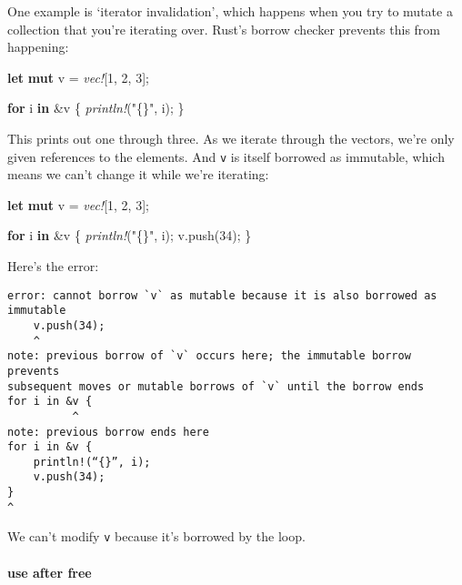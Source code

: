 \documentclass[a4paper,]{book}
\newenvironment{Shaded}{\begin{snugshade}}{\end{snugshade}}
\newcommand{\KeywordTok}[1]{\textcolor[rgb]{0.13,0.29,0.53}{\textbf{{#1}}}}
\newcommand{\DecValTok}[1]{\textcolor[rgb]{0.00,0.00,0.81}{{#1}}}
\newcommand{\StringTok}[1]{\textcolor[rgb]{0.31,0.60,0.02}{{#1}}}
\newcommand{\PreprocessorTok}[1]{\textcolor[rgb]{0.56,0.35,0.01}{\textit{{#1}}}}
\newcommand{\NormalTok}[1]{{#1}}
\let\oldparagraph\paragraph
\renewcommand{\paragraph}[1]{\oldparagraph{#1}\mbox{}}
\begin{document}
One example is `iterator invalidation', which happens when you try to
mutate a collection that you're iterating over. Rust's borrow checker
prevents this from happening:

\begin{Shaded}
\begin{Highlighting}[]
\KeywordTok{let} \KeywordTok{mut} \NormalTok{v = }\PreprocessorTok{vec!}\NormalTok{[}\DecValTok{1}\NormalTok{, }\DecValTok{2}\NormalTok{, }\DecValTok{3}\NormalTok{];}

\KeywordTok{for} \NormalTok{i }\KeywordTok{in} \NormalTok{&v \{}
    \PreprocessorTok{println!}\NormalTok{(}\StringTok{"\{\}"}\NormalTok{, i);}
\NormalTok{\}}
\end{Highlighting}
\end{Shaded}

This prints out one through three. As we iterate through the vectors,
we're only given references to the elements. And \texttt{v} is itself
borrowed as immutable, which means we can't change it while we're
iterating:

\begin{Shaded}
\begin{Highlighting}[]
\KeywordTok{let} \KeywordTok{mut} \NormalTok{v = }\PreprocessorTok{vec!}\NormalTok{[}\DecValTok{1}\NormalTok{, }\DecValTok{2}\NormalTok{, }\DecValTok{3}\NormalTok{];}

\KeywordTok{for} \NormalTok{i }\KeywordTok{in} \NormalTok{&v \{}
    \PreprocessorTok{println!}\NormalTok{(}\StringTok{"\{\}"}\NormalTok{, i);}
    \NormalTok{v.push(}\DecValTok{34}\NormalTok{);}
\NormalTok{\}}
\end{Highlighting}
\end{Shaded}

Here's the error:

\begin{verbatim}
error: cannot borrow `v` as mutable because it is also borrowed as immutable
    v.push(34);
    ^
note: previous borrow of `v` occurs here; the immutable borrow prevents
subsequent moves or mutable borrows of `v` until the borrow ends
for i in &v {
          ^
note: previous borrow ends here
for i in &v {
    println!(“{}”, i);
    v.push(34);
}
^
\end{verbatim}

We can't modify \texttt{v} because it's borrowed by the loop.

\paragraph{use after free}\label{use-after-free}
\end{document}
